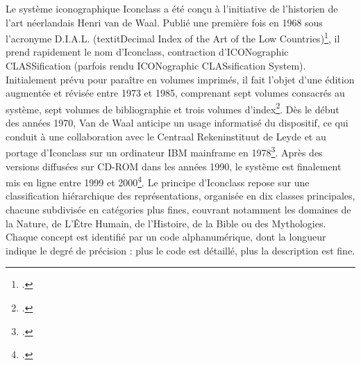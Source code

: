 Le système iconographique Iconclass a été conçu à l’initiative de l’historien de l’art néerlandais Henri van de Waal. Publié une première fois en 1968 sous l’acronyme D.I.A.L. (textit{Decimal Index of the Art of the Low Countries})\footcite{vandewaalDecimalIndexArt1968}, il prend rapidement le nom d’Iconclass, contraction d’ICONographic CLASSification (parfois rendu ICONographic CLASsification System). Initialement prévu pour paraître en volumes imprimés, il fait l’objet d’une édition augmentée et révisée entre 1973 et 1985, comprenant sept volumes consacrés au système, sept volumes de bibliographie et trois volumes d’index\footcite{vandewaalIconclassIconographicClassification1974}. Dès le début des années 1970, Van de Waal anticipe un usage informatisé du dispositif, ce qui conduit à une collaboration avec le Centraal Rekeninstituut de Leyde et au portage d’Iconclass sur un ordinateur IBM mainframe en 1978\footcite[p. 202]{brandhorstICONCLASSKeyCollaboration2017}. Après des versions diffusées sur CD-ROM dans les années 1990, le système est finalement mis en ligne entre 1999 et 2000\footcite{brandhorstSurveyVersionsIconclass}. Le principe d’Iconclass repose sur une classification hiérarchique des représentations, organisée en dix classes principales, chacune subdivisée en catégories plus fines, couvrant notamment les domaines de la Nature, de L’Être Humain, de l’Histoire, de la Bible ou des Mythologies. Chaque concept est identifié par un code alphanumérique, dont la longueur indique le degré de précision : plus le code est détaillé, plus la description est fine.

